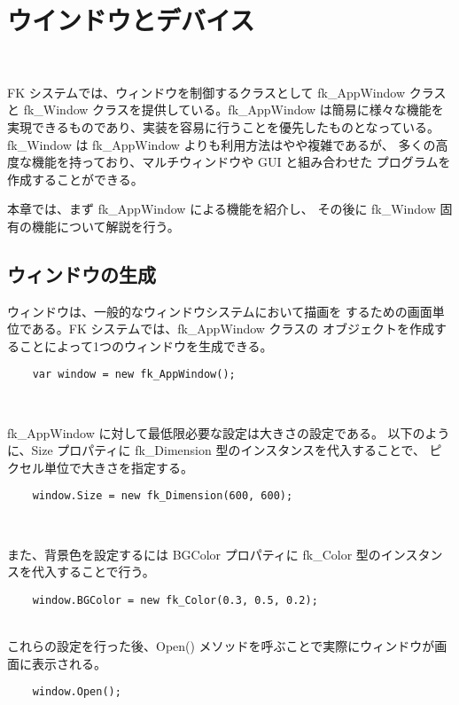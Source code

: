 \chapter{ウインドウとデバイス} \label{chap:window} ~

FK システムでは、ウィンドウを制御するクラスとして fk\_AppWindow クラスと
fk\_Window クラスを提供している。fk\_AppWindow は簡易に様々な機能を
実現できるものであり、実装を容易に行うことを優先したものとなっている。
fk\_Window は fk\_AppWindow よりも利用方法はやや複雑であるが、
多くの高度な機能を持っており、マルチウィンドウや GUI と組み合わせた
プログラムを作成することができる。

本章では、まず fk\_AppWindow による機能を紹介し、
その後に fk\_Window 固有の機能について解説を行う。

\section{ウィンドウの生成}
ウィンドウは、一般的なウィンドウシステムにおいて描画を
するための画面単位である。FK システムでは、fk\_AppWindow クラスの
オブジェクトを作成することによって1つのウィンドウを生成できる。
\\
\begin{screen}
\begin{verbatim}
    var window = new fk_AppWindow();
\end{verbatim}
\end{screen}
~

fk\_AppWindow に対して最低限必要な設定は大きさの設定である。
以下のように、Size プロパティに fk\_Dimension 型のインスタンスを代入することで、
ピクセル単位で大きさを指定する。
\\
\begin{screen}
\begin{verbatim}
    window.Size = new fk_Dimension(600, 600);
\end{verbatim}
\end{screen}
~

また、背景色を設定するには BGColor プロパティに fk\_Color 型のインスタンスを代入することで行う。
\\
\begin{screen}
\begin{verbatim}
    window.BGColor = new fk_Color(0.3, 0.5, 0.2);
\end{verbatim}
\end{screen}
~ \\

これらの設定を行った後、Open() メソッドを呼ぶことで実際にウィンドウが画面に表示される。
\\
\begin{screen}
\begin{verbatim}
    window.Open();
\end{verbatim}
\end{screen}
